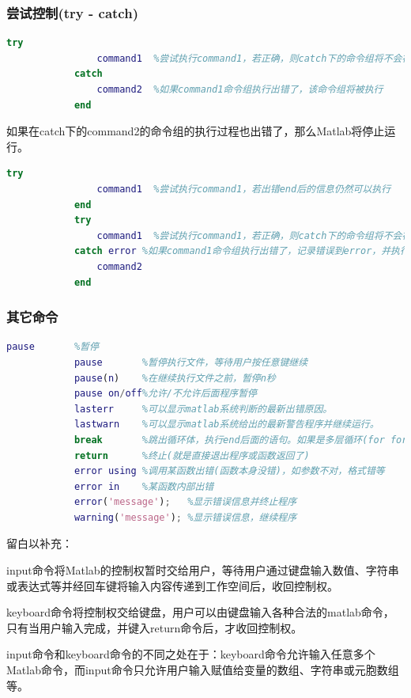         \subsubsection{尝试控制(try - catch)}
                \begin{lstlisting}[language=Matlab]
            try
                command1  %尝试执行command1，若正确，则catch下的命令组将不会被执行
            catch
                command2  %如果command1命令组执行出错了，该命令组将被执行
            end
            \end{lstlisting}
            如果在catch下的command2的命令组的执行过程也出错了，那么Matlab将停止运行。
            \begin{lstlisting}[language = Matlab]
            try
                command1  %尝试执行command1，若出错end后的信息仍然可以执行
            end
            try
                command1  %尝试执行command1，若正确，则catch下的命令组将不会被执行
            catch error %如果command1命令组执行出错了，记录错误到error，并执行command2
                command2
            end
                \end{lstlisting}
        \subsubsection{其它命令}
                \begin{lstlisting}[language=Matlab]
            pause       %暂停
            pause       %暂停执行文件，等待用户按任意键继续
            pause(n)    %在继续执行文件之前，暂停n秒
            pause on/off%允许/不允许后面程序暂停
            lasterr     %可以显示matlab系统判断的最新出错原因。
            lastwarn    %可以显示matlab系统给出的最新警告程序并继续运行。
            break       %跳出循环体，执行end后面的语句。如果是多层循环(for for for)，break只能跳出其所在的\\循环，如果break在最外层循环，则跳出所有循环。用在分支中 (switch... case)即不执行此分支\\块的下面的语句。但执行end后的语句。
            return      %终止(就是直接退出程序或函数返回了)
            error using %调用某函数出错(函数本身没错)，如参数不对，格式错等
            error in    %某函数内部出错
            error('message');   %显示错误信息并终止程序
            warning('message'); %显示错误信息，继续程序
                \end{lstlisting}
            留白以补充：\par
            input命令将Matlab的控制权暂时交给用户，等待用户通过键盘输入数值、字符串或表达式等并经回车键将输入内容传递到工作空间后，收回控制权。\par
            keyboard命令将控制权交给键盘，用户可以由键盘输入各种合法的matlab命令，只有当用户输入完成，并键入return命令后，才收回控制权。\par
            input命令和keyboard命令的不同之处在于：keyboard命令允许输入任意多个Matlab命令，而input命令只允许用户输入赋值给变量的数组、字符串或元胞数组等。\par
